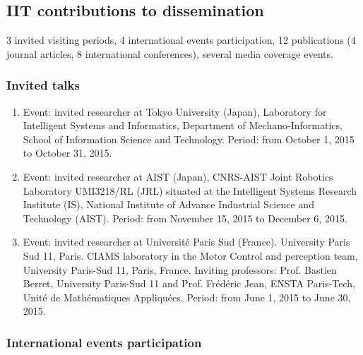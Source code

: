 \subsection{IIT contributions to dissemination}

3 invited visiting periods, 4 international events participation, 12 publications (4 journal articles, 8 international conferences), several media coverage events.

\subsubsection{Invited talks}

\begin{enumerate}
\item  Event: invited researcher at Tokyo University (Japan), Laboratory for Intelligent Systems and Informatics, Department of Mechano-Informatics, School of Information Science and Technology. Period: from October 1, 2015 to October 31, 2015.
\item  Event: invited researcher at AIST (Japan), CNRS-AIST Joint Robotics Laboratory UMI3218/RL (JRL) situated at the Intelligent Systems Research Institute (IS), National Institute of Advance Industrial Science and Technology (AIST). Period: from November 15, 2015 to December 6, 2015.
\item  Event: invited researcher at Université Paris Sud (France). University Paris Sud 11, Paris. CIAMS laboratory in the Motor Control and perception team, University Paris-Sud 11, Paris, France. Inviting professors: Prof. Bastien Berret, University Paris-Sud 11 and Prof. Fr\'ed\'eric Jean, ENSTA Paris-Tech, Unit\'e de Math\'ematiques Appliqu\'ees. Period: from June 1, 2015 to June 30, 2015.
\end{enumerate}

\subsubsection{International events participation}

